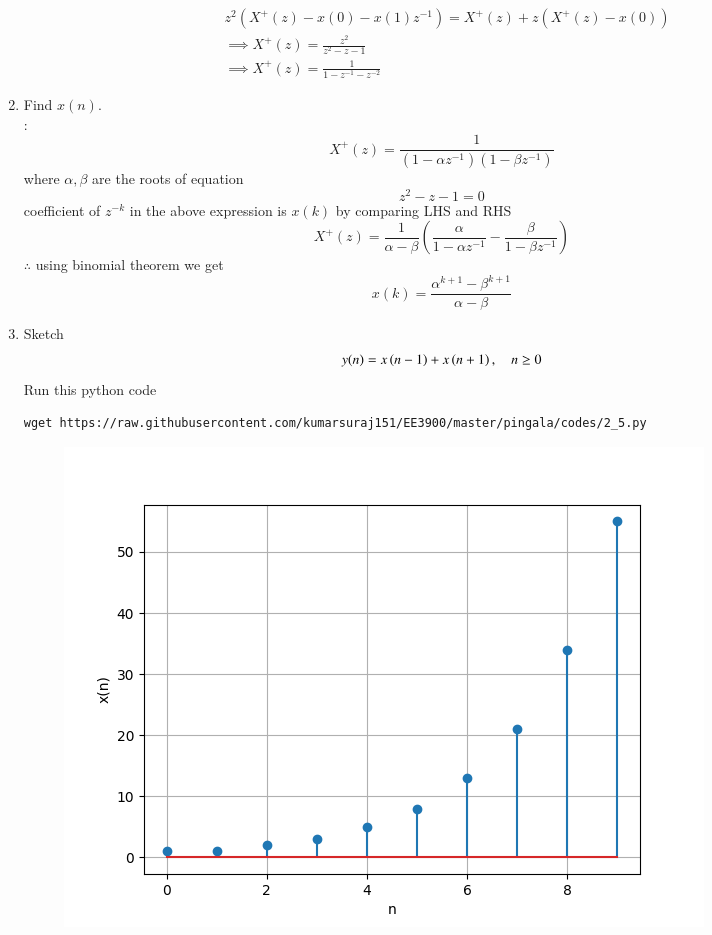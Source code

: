 \documentclass[journal,12pt,twocolumn]{IEEEtran}
\renewcommand\thesection{\arabic{section}}
\begin{document}
\begin{enumerate}[label=\thesection.\arabic*,ref=\thesection.\theenumi]
\begin{align}
	&z^{2}(X^{+}(z)-x(0)-x(1)z^{-1})=X^{+}(z)+z(X^{+}(z)-x(0))\\
	&\implies X^{+}(z)=\frac{z^{2}}{z^{2}-z-1}\\
	&\implies X^{+}(z)=\frac{1}{1-z^{-1}-z^{-2}}
\end{align}
	\item Find $x(n)$.\\
	\solution:
	\begin{equation}
		X^{+}(z)=\frac{1}{(1-\alpha z^{-1})(1-\beta z^{-1})}
	\end{equation}
	where $\alpha,\beta$ are the roots of equation
	\begin{equation}
		z^2-z-1=0
	\end{equation}
	coefficient of $z^{-k}$ in the above expression is $x(k)$ by comparing LHS and RHS\\
	\begin{equation}
		X^{+}(z)=\frac{1}{\alpha-\beta}\left(\frac{\alpha}{1-\alpha z^{-1}}-\frac{\beta}{1-\beta z^{-1}}\right)
	\end{equation}
	$\therefore$ using binomial theorem we get
	\begin{equation} 
		x(k)=\frac{\alpha^{k+1}-\beta^{k+1}}{\alpha - \beta}
	\end{equation}

	\item Sketch 
\begin{align}
	y(n)	 = x\left(n-1\right) + x\left(n+1\right),  \quad n \ge 0
	\label{eq:10-orig-diff-rev}
\end{align}
\solution  Run this python code 
\begin{lstlisting}
wget https://raw.githubusercontent.com/kumarsuraj151/EE3900/master/pingala/codes/2_5.py
\end{lstlisting}
\begin{figure}[h]
	\centering
	\includegraphics[width=0.7\columnwidth]{./figs/Fig 2.5.png}
	\caption{}
\end{figure}


\end{enumerate}
\end{document}
